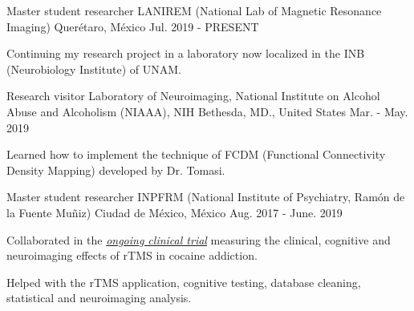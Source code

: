 \vspace{-3.2mm}
\vspace{-1.5mm}
\begin{cventries}
    \cventry
        {Master student researcher}
        {LANIREM (National Lab of Magnetic Resonance Imaging)}
        {Querétaro, México}
        {Jul. 2019 - PRESENT}
        {
            \begin{cvitems}
                \item {Continuing my research project in a laboratory now localized in the INB (Neurobiology Institute) of UNAM.}
            \end{cvitems}
        }
    \cventry
        {Research visitor}
        {Laboratory of Neuroimaging, National Institute on Alcohol Abuse and Alcoholism (NIAAA), NIH}
        {Bethesda, MD., United States}
        {Mar. - May. 2019}
        {
            \begin{cvitems}
                \item {Learned how to implement the technique of FCDM (Functional Connectivity Density Mapping) developed by Dr. Tomasi.}
            \end{cvitems}
        }
    \cventry
        {Master student researcher}
        {INPFRM (National Institute of Psychiatry, Ramón de la Fuente Muñiz)}
        {Ciudad de México, México}
        {Aug. 2017 - June. 2019}
        {
            \begin{cvitems}
            \item {Collaborated in the \href{https://clinicaltrials.gov/ct2/show/study/NCT02986438?term=Jorge+Gonzalez-Olvera&cntry=MX&rank=2}{\textit{ongoing clinical trial}} measuring the clinical, cognitive and neuroimaging effects of rTMS in cocaine addiction.}
            \item {Helped with the rTMS application, cognitive testing, database cleaning, statistical and neuroimaging analysis.}
            \end{cvitems}
        }
\end{cventries}
\vspace{-3.2mm}
